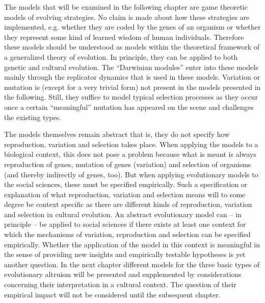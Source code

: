 The models that will be examined in the following chapter are game theoretic
models of evolving strategies. No claim is made about how these strategies are
implemented, e.g. whether they are coded by the genes of an organism or
whether they represent some kind of learned wisdom of human individuals.
Therefore these models should be understood as models within the theoretical
framework of a generalized theory of evolution. In principle, they can be
applied to both genetic and cultural evolution. The ``Darwinian modules''
enter into these models mainly through the replicator dynamics that is used in
these models. Variation or mutation is (except for a very trivial form) not
present in the models presented in the following. Still, they suffice to model
typical selection processes as they occur once a certain ``meaningful'' mutation
has appeared on the scene and challenges the existing types.

The models themselves remain abstract that is, they do not specify how
reproduction, variation and selection takes place. When applying the models to
a biological context, this does not pose a problem because what is meant is
always reproduction of genes, mutation of genes (variation) and selection of
organisms (and thereby indirectly of genes, too). But when applying
evolutionary models to the social sciences, these must be specified
empirically. Such a specification or explanation of what reproduction,
variation and selection means will to some degree be context specific as there
are different kinds of reproduction, variation and selection in cultural
evolution. An abstract evolutionary model can -- in principle -- be applied to
social sciences if there exists at least one context for which the mechanisms
of variation, reproduction and selection can be specified empirically. Whether
the application of the model in this context is meaningful in the sense of
providing new insights and empirically testable hypotheses is yet another
question. In the next chapter different models for the three basic types of
evolutionary altruism will be presented and supplemented by considerations
concerning their interpretation in a cultural context. The question of their
empirical impact will not be considered until the subsequent chapter.

